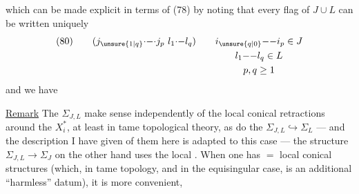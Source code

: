 
which can be made explicit in terms of (78) by noting that every flag of $J\cup L$  can be written uniquely
\[
(80)\qquad(j_{\unsure{1|q}}\mathord{\cdot}\mathord{-}\mathord{\cdot}j_p\ l_1\mathord{\cdot}\mathord{-}l_q)\qquad
\begin{gathered}[t]
i_{\unsure{q|0}}\mathord{-}\mathord{-}i_p\in J\\
l_1\mathord{-}\mathord{-}l_q\in L\\
p,q\geq1
\end{gathered}
\]
and  we have

\uline{Remark} The $\Sigma_{J,L}$ make sense  independently of the local conical retractions around the $X_i^*$, at least in tame topological theory, as do the $\Sigma_{J,L}\hookrightarrow\Sigma_L$ --- and the description I have given of them here is adapted to this case --- the structure $\Sigma_{J,L}\to\Sigma_J$ on the other hand uses the local    . When one has $=$ local conical structures (which, in tame topology, and in the equisingular case, is an additional ``harmless'' datum), it is more convenient,
